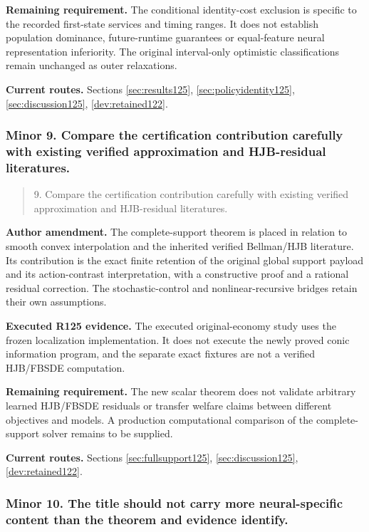 \noindent\textbf{Remaining requirement.} The conditional identity-cost exclusion is specific to the recorded first-state services and timing ranges. It does not establish population dominance, future-runtime guarantees or equal-feature neural representation inferiority. The original interval-only optimistic classifications remain unchanged as outer relaxations.

\noindent\textbf{Current routes.} Sections \ref{sec:results125}, \ref{sec:policyidentity125}, \ref{sec:discussion125}, \ref{dev:retained122}.

\subsubsection{Minor 9. Compare the certification contribution carefully with existing verified approximation and HJB-residual literatures.}

\begin{quote}\small
9. Compare the certification contribution carefully with existing verified approximation and HJB-residual literatures.
\end{quote}

\noindent\textbf{Author amendment.} The complete-support theorem is placed in relation to smooth convex interpolation and the inherited verified Bellman/HJB literature. Its contribution is the exact finite retention of the original global support payload and its action-contrast interpretation, with a constructive proof and a rational residual correction. The stochastic-control and nonlinear-recursive bridges retain their own assumptions.

\noindent\textbf{Executed R125 evidence.} The executed original-economy study uses the frozen localization implementation. It does not execute the newly proved conic information program, and the separate exact fixtures are not a verified HJB/FBSDE computation.

\noindent\textbf{Remaining requirement.} The new scalar theorem does not validate arbitrary learned HJB/FBSDE residuals or transfer welfare claims between different objectives and models. A production computational comparison of the complete-support solver remains to be supplied.

\noindent\textbf{Current routes.} Sections \ref{sec:fullsupport125}, \ref{sec:discussion125}, \ref{dev:retained122}.

\subsubsection{Minor 10. The title should not carry more neural-specific content than the theorem and evidence identify.}

